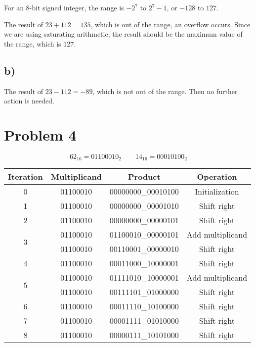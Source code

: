 \documentclass[a4paper,12pt]{article}
\begin{document}
For an 8-bit signed integer, the range is $-2^7$ to $2^7 - 1$, or $-128$ to $127$.

The result of $23 + 112 = 135$, which is out of the range, an overflow occurs.
Since we are using saturating arithmetic, the result should be the maximum value of the range, which is $127$.

\subsection*{b)}

The result of $23 - 112 = -89$, which is not out of the range.
Then no further action is needed.

\section*{Problem 4}

\begin{equation*}
	62_{16} = 01100010_2 \qquad 14_{16} = 00010100_2
\end{equation*}

\begin{center}
	\begin{tabular}{cccc}
		\toprule
		\textbf{Iteration} & \textbf{Multiplicand} & \textbf{Product} & \textbf{Operation} \\
		\midrule
		0 & 01100010 & 00000000\_00010100 & Initialization \\
		\hline
		1 & 01100010 & 00000000\_00001010 & Shift right \\
		\hline
		2 & 01100010 & 00000000\_00000101 & Shift right \\
		\hline
		\multirow{2}{*}{3} & 01100010 & 01100010\_00000101 & Add multiplicand \\
		& 01100010 & 00110001\_00000010 & Shift right \\
		\hline
		4 & 01100010 & 00011000\_10000001 & Shift right \\
		\hline
		\multirow{2}{*}{5} & 01100010 & 01111010\_10000001 & Add multiplicand \\
		& 01100010 & 00111101\_01000000 & Shift right \\
		\hline
		6 & 01100010 & 00011110\_10100000 & Shift right \\
		\hline
		7 & 01100010 & 00001111\_01010000 & Shift right \\
		\hline
		8 & 01100010 & 00000111\_10101000 & Shift right \\
		\bottomrule
	\end{tabular}
\end{center}
\end{document}
